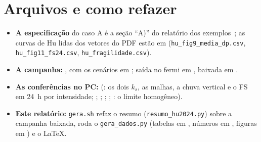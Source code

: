 \documentclass[11pt,a4paper]{article}
\begin{document}
\section{Arquivos e como refazer}
\begin{itemize}
  \item \textbf{A especificação} do caso A é a seção ``A)'' do relatório dos exemplos~\cite{exemplos}; as curvas de
    Hu lidas dos vetores do PDF estão em  (\texttt{hu\_fig9\_media\_dp.csv},
    \texttt{hu\_fig11\_fs24.csv}, \texttt{hu\_fragilidade.csv}).
  \item \textbf{A campanha:} , com os cenários
    em ; saída no fermi em , baixada em
    .
  \item \textbf{As conferências no PC:}  (: os dois $k_s$, as malhas, a chuva
    vertical e o FS em 24~h por intensidade; ; ; ; ;
    : o limite homogêneo).
  \item \textbf{Este relatório:} \texttt{gera.sh} refaz o resumo (\texttt{resumo\_hu2024.py}) sobre a campanha baixada,
    roda o \texttt{gera\_dados.py} (tabelas em , números em , figuras em ) e
    o \LaTeX.
\end{itemize}
\end{document}
